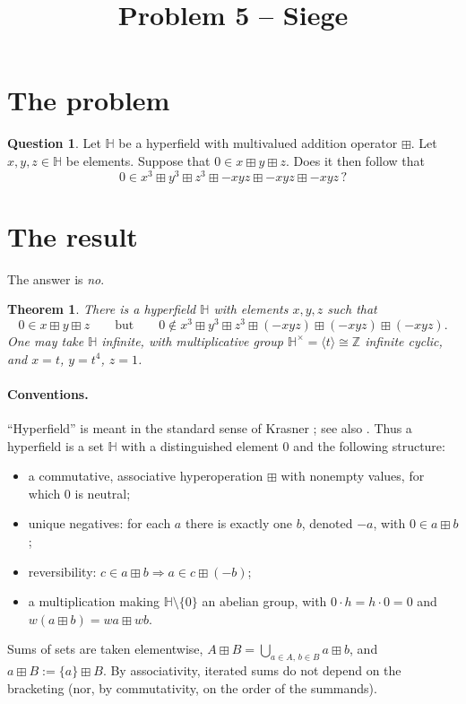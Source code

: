 \documentclass[11pt]{article}
\title{Problem 5 -- Siege}
\author{}
\date{}
\newtheorem{theorem}{Theorem}
\theoremstyle{definition}
\newtheorem{question}{Question}
\theoremstyle{remark}
\newcommand{\HH}{\mathbb{H}}
\newcommand{\Z}{\mathbb{Z}}
\newcommand{\bp}{\boxplus}
\begin{document}
\maketitle

\section{The problem}

\begin{question}\label{ques:main}
Let $\HH$ be a hyperfield with multivalued addition operator $\bp$. Let $x,y,z\in\HH$ be elements. Suppose that $0\in x\bp y\bp z$. Does it then follow that
\[
0\in x^3\bp y^3\bp z^3\bp -xyz\bp -xyz\bp -xyz\,?
\]
\end{question}

\section{The result}

The answer is \emph{no}.

\begin{theorem}\label{thm:main}
There is a hyperfield $\HH$ with elements $x,y,z$ such that
\[
0\in x\bp y\bp z
\qquad\text{but}\qquad
0\notin x^3\bp y^3\bp z^3\bp(-xyz)\bp(-xyz)\bp(-xyz).
\]
One may take $\HH$ infinite, with multiplicative group $\HH^\times=\langle t\rangle\cong\Z$ infinite cyclic, and $x=t$, $y=t^4$, $z=1$.
\end{theorem}

\paragraph{Conventions.} ``Hyperfield'' is meant in the standard sense of Krasner \cite{Kr57,Kr83}; see also \cite{Viro,BB}. Thus a hyperfield is a set $\HH$ with a distinguished element $0$ and the following structure:
\begin{itemize}[nosep]
\item a commutative, associative hyperoperation $\bp$ with nonempty values, for which $0$ is neutral;
\item unique negatives: for each $a$ there is exactly one $b$, denoted $-a$, with $0\in a\bp b$;
\item reversibility: $c\in a\bp b\Rightarrow a\in c\bp(-b)$;
\item a multiplication making $\HH\setminus\{0\}$ an abelian group, with $0\cdot h=h\cdot 0=0$ and $w(a\bp b)=wa\bp wb$.
\end{itemize}
Sums of sets are taken elementwise, $A\bp B=\bigcup_{a\in A,\,b\in B}a\bp b$, and $a\bp B:=\{a\}\bp B$. By associativity, iterated sums do not depend on the bracketing (nor, by commutativity, on the order of the summands).
\end{document}
